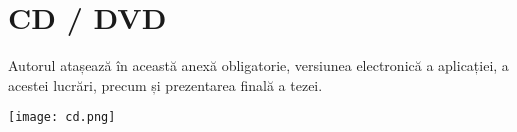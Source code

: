 \chapter{CD / DVD}

\begin{singlespace}
    Autorul atașează în această anexă obligatorie, versiunea electronică a aplicației, 
    a acestei lucrări, precum și prezentarea finală a tezei.
\end{singlespace}

\begin{center}
    \texttt{[image: cd.png]}
\end{center}